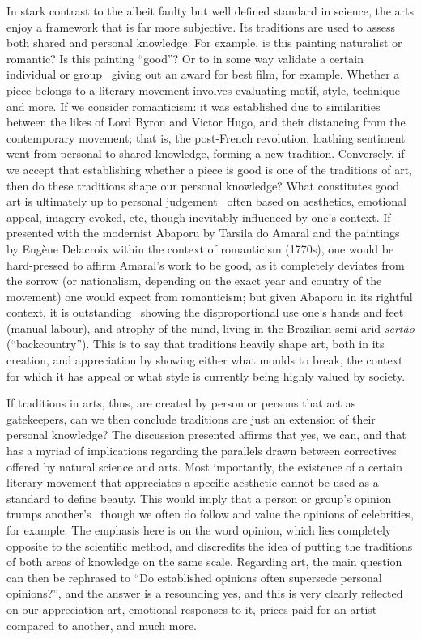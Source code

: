 \documentclass[12pt,a4paper]{article}
\begin{document}
In stark contrast to the albeit faulty but well defined standard in science, the arts enjoy a framework that is far more subjective. Its traditions are used to assess both shared and personal knowledge: For example, is this painting naturalist or romantic? Is this painting ``good''? Or to in some way validate a certain individual or group \textendash\ giving out an award for best film, for example. Whether a piece belongs to a literary movement involves evaluating motif, style, technique and more. If we consider romanticism: it was established due to similarities between the likes of Lord Byron and Victor Hugo, and their distancing from the contemporary movement; that is, the post-French revolution, loathing sentiment went from personal to shared knowledge, forming a new tradition. Conversely, if we accept that establishing whether a piece is good is one of the traditions of art, then do these traditions shape our personal knowledge? What constitutes good art is ultimately up to personal judgement \textendash\ often based on aesthetics, emotional appeal, imagery evoked, etc, though inevitably influenced by one's context. If presented with the modernist Abaporu by Tarsila do Amaral and the paintings by Eug\`{e}ne Delacroix within the context of romanticism (1770s), one would be hard-pressed to affirm Amaral's work to be good, as it completely deviates from the sorrow (or nationalism, depending on the exact year and country of the movement) one would expect from romanticism; but given Abaporu in its rightful context, it is outstanding \textendash\ showing the disproportional use one's hands and feet (manual labour), and atrophy of the mind, living in the Brazilian semi-arid \textit{sert\~{a}o} (``backcountry''). This is to say that traditions heavily shape art, both in its creation, and appreciation by showing either what moulds to break, the context for which it has appeal or what style is currently being highly valued by society.

If traditions in arts, thus, are created by person or persons that act as gatekeepers, can we then conclude traditions are just an extension of their personal knowledge? The discussion presented affirms that yes, we can, and that has a myriad of implications regarding the parallels drawn between correctives offered by natural science and arts. Most importantly, the existence of a certain literary movement that appreciates a specific aesthetic cannot be used as a standard to define beauty. This would imply that a person or group's opinion trumps another's \textendash\ though we often do follow and value the opinions of celebrities, for example. The emphasis here is on the word opinion, which lies completely opposite to the scientific method, and discredits the idea of putting the traditions of both areas of knowledge on the same scale. Regarding art, the main question can then be rephrased to ``Do established opinions often supersede personal opinions?'', and the answer is a resounding yes, and this is very clearly reflected on our appreciation art, emotional responses to it, prices paid for an artist compared to another, and much more.
\end{document}
